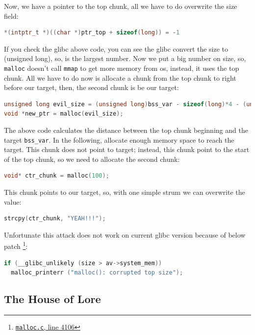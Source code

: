 \documentclass{masterthesis}
\newcommand*\libc{glibc}
\newcommand*\mallocc{\lstinline{malloc}}
\newcommand*\mmapc{\lstinline{mmap}}
\begin{document}
Now, we have a pointer to the top chunk, all we have to do overwrite the size field:

\begin{lstlisting}[language=c,frame=tlrb]
*(intptr_t *)((char *)ptr_top + sizeof(long)) = -1
\end{lstlisting}

If you check the \libc{} above code, you can see the \libc{} convert the size to (unsigned long), so,  is the largest number. Now we put a big number on size, so, \mallocc{} doesn’t call \mmapc{} to get more memory from os, instead, it uses the top chunk. All we have to do now is allocate a chunk from the top chunk to right before our target, then, the second chunk is be our target:

\begin{lstlisting}[language=c,frame=tlrb]
unsigned long evil_size = (unsigned long)bss_var - sizeof(long)*4 - (unsigned long)ptr_top;
void *new_ptr = malloc(evil_size);
\end{lstlisting}

The above code calculates the distance between the top chunk beginning and the target \lstinline{bss_var}. In the following, allocate enough memory space to reach the target. This chunk does not point to target; instead, this chunk point to the start of the top chunk, so we need to allocate the second chunk:

\begin{lstlisting}[language=c,frame=tlrb]
void* ctr_chunk = malloc(100);
\end{lstlisting}

This chunk points to our target, so, with one simple strum we can overwrite the value:

\begin{lstlisting}[language=c,frame=tlrb]
strcpy(ctr_chunk, "YEAH!!!");
\end{lstlisting}

Unfortunate this attack does not work on current \libc{} version because of below patch \footnote{\href{https://sourceware.org/git/?p=glibc.git;a=blob;f=malloc/malloc.c;h=f7cd29bc2f93e1082ee77800bd64a4b2a2897055;hb=9ea3686266dca3f004ba874745a4087a89682617\#l4106}{\texttt{malloc.c}, line 4106}}:
\begin{lstlisting}[language=c,frame=tlrb]
if (__glibc_unlikely (size > av->system_mem))
  malloc_printerr ("malloc(): corrupted top size");
\end{lstlisting}

\subsection{The House of Lore}
\end{document}
